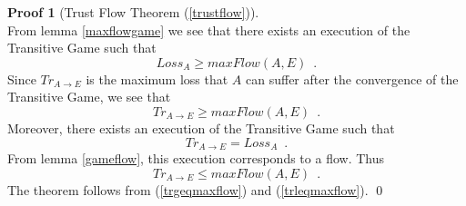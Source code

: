 \documentclass[11pt]{llncs}
\theoremstyle{definition}
\newtheorem{sepproof}{Proof}
\begin{document}
    \begin{sepproof}[Trust Flow Theorem (\ref{trustflow})] \ \\
       From lemma \ref{maxflowgame} we see that there exists an execution of the Transitive Game such that
       \begin{equation*}
          Loss_A \geq maxFlow\left(A, E\right) \enspace.
       \end{equation*}
       Since $Tr_{A \rightarrow E}$ is the maximum loss that $A$ can suffer after the convergence of the Transitive Game, we
       see that
       \begin{equation}
       \label{trgeqmaxflow}
          Tr_{A \rightarrow E} \geq maxFlow\left(A, E\right) \enspace.
       \end{equation}
       Moreover, there exists an execution of the Transitive Game such that
       \begin{equation*}
          Tr_{A \rightarrow E} = Loss_A \enspace.
       \end{equation*}
       From lemma \ref{gameflow}, this execution corresponds to a flow. Thus
       \begin{equation}
       \label{trleqmaxflow}
          Tr_{A \rightarrow E} \leq maxFlow\left(A, E\right) \enspace.
       \end{equation}
       The theorem follows from (\ref{trgeqmaxflow}) and (\ref{trleqmaxflow}). \qed
    \end{sepproof}
\end{document}
